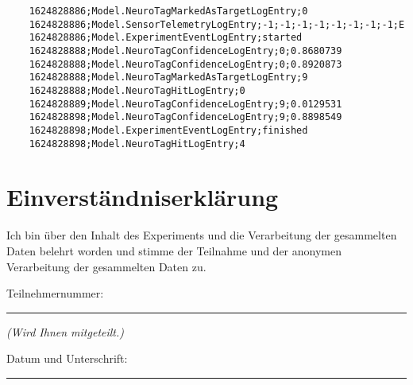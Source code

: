 \documentclass[a4paper,10pt,oneside,headsepline]{scrartcl}
\newcommand{\Qline}[1]{\noindent\rule{#1}{0.6pt}}
\begin{document}
\begin{lstlisting}
    1624828886;Model.NeuroTagMarkedAsTargetLogEntry;0
    1624828886;Model.SensorTelemetryLogEntry;-1;-1;-1;-1;-1;-1;-1;-1;E
    1624828886;Model.ExperimentEventLogEntry;started
    1624828888;Model.NeuroTagConfidenceLogEntry;0;0.8680739
    1624828888;Model.NeuroTagConfidenceLogEntry;0;0.8920873
    1624828888;Model.NeuroTagMarkedAsTargetLogEntry;9
    1624828888;Model.NeuroTagHitLogEntry;0
    1624828889;Model.NeuroTagConfidenceLogEntry;9;0.0129531
    1624828898;Model.NeuroTagConfidenceLogEntry;9;0.8898549
    1624828898;Model.ExperimentEventLogEntry;finished
    1624828898;Model.NeuroTagHitLogEntry;4
\end{lstlisting}

\bigskip

\section*{Einverständniserklärung}

Ich bin über den Inhalt des Experiments und die Verarbeitung der gesammelten Daten belehrt worden und stimme der Teilnahme und der anonymen Verarbeitung der gesammelten Daten zu.

\bigskip
\bigskip

\noindent Teilnehmernummer: \Qline{3cm} \textit{(Wird Ihnen mitgeteilt.)}

\bigskip
\bigskip
\bigskip


\noindent Datum und Unterschrift: \Qline{10cm}
\end{document}
